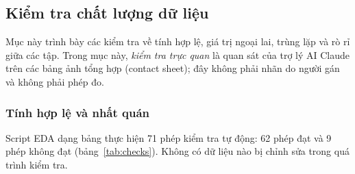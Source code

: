 \subsection{Kiểm tra chất lượng dữ liệu}
\label{sec:eda-quality}

Mục này trình bày các kiểm tra về tính hợp lệ, giá trị ngoại lai, trùng lặp và rò rỉ giữa các tập. Trong mục này, \emph{kiểm tra trực quan} là quan sát của trợ lý AI Claude trên các bảng ảnh tổng hợp (contact sheet); đây không phải nhãn do người gán và không phải phép đo.

\subsubsection*{Tính hợp lệ và nhất quán}

Script EDA dạng bảng thực hiện 71 phép kiểm tra tự động: 62 phép đạt và 9 phép không đạt (bảng~\ref{tab:checks}). Không có dữ liệu nào bị chỉnh sửa trong quá trình kiểm tra.

